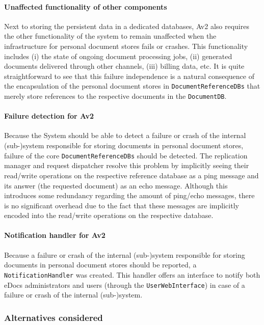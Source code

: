 \documentclass[a4paper,10pt]{article}
\begin{document}
\paragraph{Unaffected functionality of other components}
Next to storing the  persistent data in a dedicated databases, Av2 also requires the other functionality of the system to remain unaffected when the infrastructure for personal document stores fails or crashes. This functionality includes (i) the state of ongoing document processing jobs, (ii) generated documents delivered through other channels, (iii) billing data, etc. It is quite straightforward to see that this failure independence is a natural consequence of the encapsulation of the personal document stores in \texttt{DocumentReferenceDBs} that merely store references to the respective documents in the \texttt{DocumentDB}.


\paragraph{Failure detection for Av2}
Because the System should be able to detect a failure or crash of the internal (sub-)system responsible for storing documents in personal document stores, failure of the core \texttt{DocumentReferenceDBs} should be detected. The replication manager and request dispatcher resolve this problem by implicitly seeing their read/write operations on the respective reference database as a ping message and its answer (the requested document) as an echo message. Although this introduces some redundancy regarding the amount of ping/echo messages, there is no significant overhead due to the fact that these messages are implicitly encoded into the read/write operations on the respective database.


\paragraph{Notification handler for Av2}
Because a failure or crash of the internal (sub-)system responsible for storing documents in personal document stores should be reported, a \texttt{NotificationHandler} was created. This handler offers an interface to notify both eDocs administrators and users (through the \texttt{UserWebInterface}) in case of a failure or crash of the internal (sub-)system.


\subsubsection*{Alternatives considered}
\end{document}
